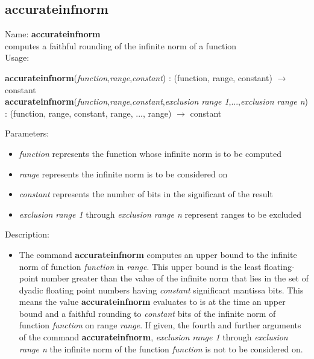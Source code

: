 \subsection{accurateinfnorm}
\label{labaccurateinfnorm}
\noindent Name: \textbf{accurateinfnorm}\\
computes a faithful rounding of the infinite norm of a function \\

\noindent Usage: 
\begin{center}
\textbf{accurateinfnorm}(\emph{function},\emph{range},\emph{constant}) : (\textsf{function}, \textsf{range}, \textsf{constant}) $\rightarrow$ \textsf{constant}\\
\textbf{accurateinfnorm}(\emph{function},\emph{range},\emph{constant},\emph{exclusion range 1},...,\emph{exclusion range n}) : (\textsf{function}, \textsf{range}, \textsf{constant}, \textsf{range}, ..., \textsf{range}) $\rightarrow$ \textsf{constant}\\
\end{center}
Parameters: 
\begin{itemize}
\item \emph{function} represents the function whose infinite norm is to be computed
\item \emph{range} represents the infinite norm is to be considered on
\item \emph{constant} represents the number of bits in the significant of the result
\item \emph{exclusion range 1} through \emph{exclusion range n} represent ranges to be excluded 
\end{itemize}
\noindent Description: \begin{itemize}

\item The command \textbf{accurateinfnorm} computes an upper bound to the infinite norm of
   function \emph{function} in \emph{range}. This upper bound is the least
   floating-point number greater than the value of the infinite norm that
   lies in the set of dyadic floating point numbers having \emph{constant}
   significant mantissa bits. This means the value \textbf{accurateinfnorm} evaluates to
   is at the time an upper bound and a faithful rounding to \emph{constant}
   bits of the infinite norm of function \emph{function} on range \emph{range}.
   If given, the fourth and further arguments of the command \textbf{accurateinfnorm},
   \emph{exclusion range 1} through \emph{exclusion range n} the infinite norm of
   the function \emph{function} is not to be considered on.
\end{itemize}
